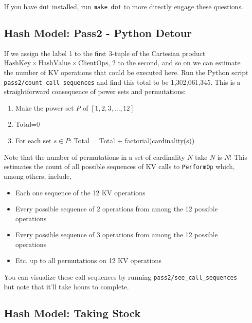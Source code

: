 \documentclass[twocolumn]{article}
\begin{document}
If you have \texttt{dot} installed, run \texttt{make dot} to more directly engage these questions.

\subsection{Hash Model: Pass2 - Python Detour}

If we assign the label 1 to the first 3-tuple of the Cartesian product $\text{HashKey} \times \text{HashValue} \times \text{ClientOps}$, 2 to the second, and so on we can estimate the number of KV operations that could be executed here. Run the Python script \texttt{pass2/count\_call\_sequences} and find this total to be 1,302,061,345. This is a straightforward consequence of power sets and permutations:

\begin{enumerate}
\item Make the power set $P$ of $[1,2,3,\ldots,12]$
\item Total=0
\item For each set $s \in P$: Total = Total + factorial(cardinality(s))
\end{enumerate}

Note that the number of permutations in a set of cardinality $N$ take $N$ is $N!$ This estimates the count of all possible sequences of KV calls to \texttt{PerformOp} which, among others, include,

\begin{itemize}
\item Each one sequence of the 12 KV operations
\item Every possible sequence of 2 operations from among the 12 possible operations
\item Every possible sequence of 3 operations from among the 12 possible operations
\item Etc. up to all permutations on 12 KV operations
\end{itemize}

\noindent You can visualize these call sequences by running \texttt{pass2/see\_call\_sequences} but note that it'll take hours to complete.

\subsection{Hash Model: Taking Stock}
\end{document}
